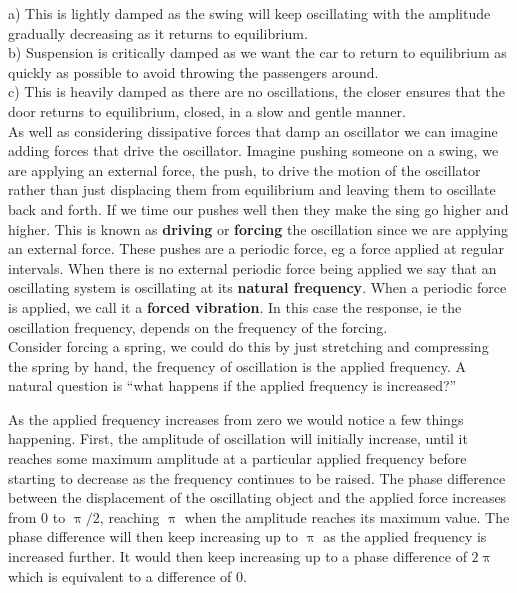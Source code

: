 a) This is lightly damped as the swing will keep oscillating with the amplitude gradually decreasing as it returns to equilibrium. \\

b) Suspension is critically damped as we want the car to return to equilibrium as quickly as possible to avoid throwing the passengers around.\\

c) This is heavily damped as there are no oscillations, the closer ensures that the door returns to equilibrium, closed, in a slow and gentle manner.\\


As well as considering dissipative forces that damp an oscillator we can imagine adding forces that drive the oscillator. Imagine pushing someone on a swing, we are applying an external force, the push, to drive the motion of the oscillator rather than just displacing them from equilibrium and leaving them to oscillate back and forth. If we time our pushes well then they make the sing go higher and higher. This is known as \textbf{driving} or \textbf{forcing} the oscillation since we are applying an external force. These pushes are a periodic force, eg a force applied at regular intervals. When there is no external periodic force being applied we say that an oscillating system is oscillating at its \textbf{natural frequency}. When a periodic force is applied, we call it a \textbf{forced vibration}. In this case the response, ie the oscillation frequency, depends on the frequency of the forcing.\\

Consider forcing a spring, we could do this by just stretching and compressing the spring by hand, the frequency of oscillation is the applied frequency. A natural question is ``what happens if the applied frequency is increased?'' 

As the applied frequency increases from zero we would notice a few things happening. First, the amplitude of oscillation will initially increase, until it reaches some maximum amplitude at a particular applied frequency before starting to decrease as the frequency continues to be raised. The phase difference between the displacement of the oscillating object and the applied force increases from $0$ to $\uppi/2$, reaching $\uppi$ when the amplitude reaches its maximum value. The phase difference will then keep increasing up to $\uppi$ as the applied frequency is increased further. It would then keep increasing up to a phase difference of $2\uppi$ which is equivalent to a difference of $0$.\\

